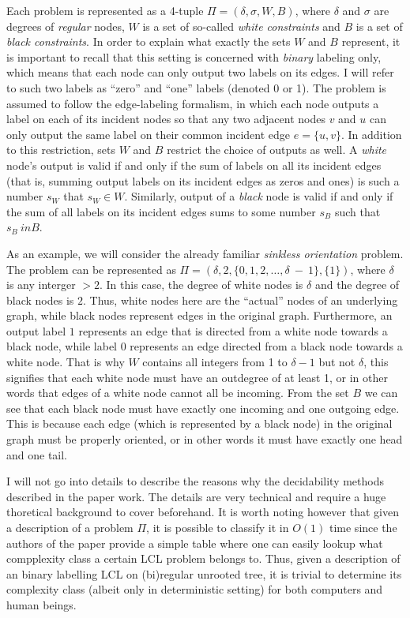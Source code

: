 Each problem is represented as a 4-tuple $\Pi = (\delta, \sigma, W, B)$, where
$\delta$ and $\sigma$ are degrees of \emph{regular} nodes, $W$ is a set of so-called
\emph{white constraints} and $B$ is a set of \emph{black constraints}. In order to
explain what exactly the sets $W$ and $B$ represent, it is important to recall that
this setting is concerned with \emph{binary} labeling only, which means that each node
can only output two labels on its edges. I will refer to such two labels as ``zero'' and ``one''
labels (denoted 0 or 1). The problem is assumed to follow the edge-labeling
formalism, in which each node outputs a label on each of its incident nodes so that
any two adjacent nodes $v$ and $u$ can only output the same label on their common
incident edge $e = \{u, v\}$. In addition to this restriction, sets $W$ and $B$
restrict the choice of outputs as well. A \emph{white} node's output is valid
if and only if the sum of labels on all its incident edges (that is, summing
output labels on its incident edges as zeros and ones) is such a number $s_W$ that
$s_W \in W$. Similarly, output of a \emph{black} node is valid if and only if
the sum of all labels on its incident edges sums to some number $s_B$ such that
$s_B \ in B$.

As an example, we will consider the already familiar \emph{sinkless orientation}
problem. The problem can be represented as $\Pi = (\delta, 2, \{0, 1, 2, \dots, \delta~-~1\}, \{ 1 \})$,
where $\delta$ is any interger $> 2$. In this case, the degree of white nodes is
$\delta$ and the degree of black nodes is $2$. Thus, white nodes here are the ``actual''
nodes of an underlying graph, while black nodes represent edges in the original graph.
Furthermore, an output label $1$ represents an edge
that is directed from a white node towards a black node, while label $0$ represents
an edge directed from a black node towards a white node. That is why
$W$ contains all integers from 1 to $\delta - 1$ but not $\delta$,
this signifies that each white node must have an outdegree of at least 1,
or in other words that edges of a white node cannot all be incoming.
From the set $B$ we can see that each black node must have 
exactly one incoming and one outgoing edge. This is because each edge (which is represented by a black node)
in the original graph must be properly oriented, or in other words it must
have exactly one head and one tail.

I will not go into details to describe the reasons why the decidability methods
described in the paper work. The details are very technical and require a huge
thoretical background to cover beforehand. It is worth noting however that
given a description of a problem $\Pi$, it is possible to classify it in $O(1)$
time since the authors of the paper provide a simple table where one can
easily lookup what compplexity class a certain LCL problem belongs to. Thus,
given a description of an binary labelling LCL on (bi)regular unrooted tree,
it is trivial to determine its complexity class (albeit only in deterministic setting)
for both computers and human beings.

